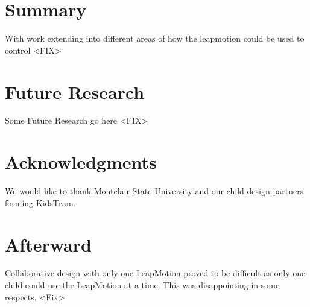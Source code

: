 \section{Summary}
With work extending into different areas of how the leapmotion could be used to control
<FIX>
\section{Future Research}
Some Future Research go here <FIX>

\section{Acknowledgments}
We would like to thank Montclair State University and our child design partners forming KidsTeam.

\section{Afterward}
Collaborative design with only one LeapMotion proved to be difficult as only one child could use the LeapMotion at a time. This was disappointing in some respects. <Fix>


